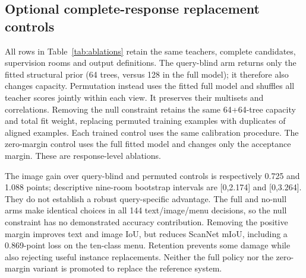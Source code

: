 \subsection{Optional complete-response replacement controls}

All rows in Table~\ref{tab:ablations} retain the same teachers, complete
candidates, supervision rooms and output definitions. The query-blind arm returns only the fitted structural prior (64 trees,
versus 128 in the full model); it therefore also changes capacity. Permutation
instead uses the fitted full model and
shuffles all teacher scores jointly within each view. It preserves their
multisets and correlations. Removing the null constraint retains the same
64+64-tree capacity and total fit weight, replacing permuted training examples
with duplicates of aligned examples. Each trained control uses the same
calibration procedure. The zero-margin control uses the full fitted model and
changes only the acceptance margin. These are response-level ablations.

\begin{table}[ht]
\centering\small\resizebox{\linewidth}{!}{}
\caption{Matched controls on all ten ScanNet rooms and 268 UQIS queries.
S19/15/10 are mesh mIoU. Repair/harm counts concern actual UQIS set IoU;
unchanged actual points are included in the denominator. This is one coupled
policy comparison, not a collection of per-benchmark best runs.}
\label{tab:ablations}
\end{table}

The image gain over query-blind and permuted controls is respectively 0.725 and
1.088 points; descriptive nine-room bootstrap intervals are [0,2.174] and
[0,3.264]. They do not establish a robust query-specific advantage. The full
and no-null arms make identical choices in all 144 text/image/menu decisions,
so the null constraint has no demonstrated accuracy contribution. Removing the
positive margin improves text and image IoU, but reduces ScanNet mIoU, including
a 0.869-point loss on the ten-class menu. Retention prevents some damage while
also rejecting useful instance replacements. Neither the full policy nor the
zero-margin variant is promoted to replace the reference system.

